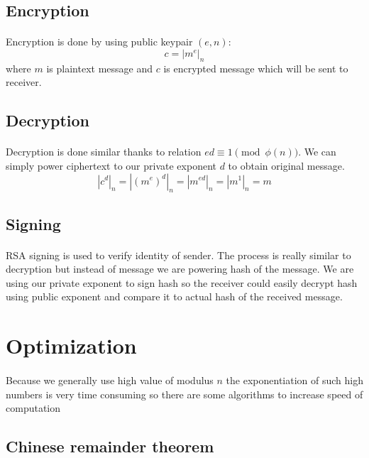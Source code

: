 \documentclass[thesis=B,english]{FITthesis}[2012/10/20]
\begin{document}
{\subsection{Encryption}
\paragraph*{}
{Encryption is done by using public keypair \((e, n)\): \[c = | m^e | _n\]
where \(m\) is plaintext message and \(c\) is encrypted message which will be sent to receiver.
}
\subsection{Decryption}
\paragraph*{}
{Decryption is done similar thanks to relation \(ed \equiv 1 \pmod{\phi(n)}\). We can simply power ciphertext to our private exponent \(d\) to obtain original message.  
\[ |c^d|_n = |(m^e)^d|_n = | m^{ed}|_n = |m^1|_n = m\]}

\subsection{Signing}
\paragraph*{}{
RSA signing is used to verify identity of sender. The process is really similar to decryption but instead of message we are powering hash of the message.
We are using our private exponent to sign hash so the receiver could easily decrypt hash using public exponent and compare it to actual hash of the received message.
}

\section{Optimization}
\paragraph*{}
{Because we generally use high value of modulus \(n\) the exponentiation of such high numbers is very time consuming so there are some algorithms to increase speed of computation }

\subsection{Chinese remainder theorem}

}
\end{document}

